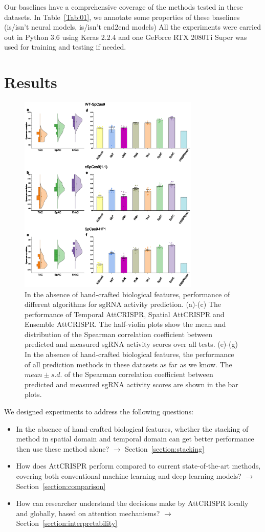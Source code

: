 \documentclass{bioinfo}
\begin{document}
Our baselines have a comprehensive coverage of the methods tested in these datasets. 
In Table~\ref{Tab:01}, we annotate some properties of these baselines (is/isn't neural models, is/isn't end2end models)
All the experiments were carried out in Python 3.6 using Keras 2.2.4 and one GeForce RTX 2080Ti Super was used for training and testing if needed. 

\section{Results}
\begin{figure}[!tpb]%
    \centerline{\includegraphics[width=86mm]{baselinewithoutbiofeat.eps}}
    \caption{In the absence of hand-crafted biological features, performance of different algorithms for sgRNA activity prediction. 
    (a)-(c) The performance of Temporal AttCRISPR, Spatial AttCRISPR and Ensemble AttCRISPR. 
    The half-violin plots show the mean and distribution of the Spearman correlation coefficient between predicted and measured sgRNA activity scores over all tests. 
    (e)-(g) In the absence of hand-crafted biological features, the performance of all prediction methods in these datasets as far as we know. 
    The $mean \pm s.d.$ of the Spearman correlation coefficient between predicted and measured sgRNA activity scores are shown in the bar plots.}\label{fig:06}
\end{figure}
We designed experiments to address the following questions:
\begin{itemize}
    \item 
    In the absence of hand-crafted biological features, whether the stacking of method in spatial domain and temporal domain can get better performance then use these method alone? 
    $\rightarrow$ Section~\ref{section:stacking}
    \item 
    How does AttCRISPR perform compared to current state-of-the-art methods, covering both conventional machine learning and deep-learning models? 
    $\rightarrow$ Section~\ref{section:comparison}
    \item 
    How can researcher understand the decisions make by AttCRISPR locally and globally, based on attention mechanisms? 
    $\rightarrow$ Section~\ref{section:interpretability}
    \vspace*{1pt}
\end{itemize}
\end{document}
